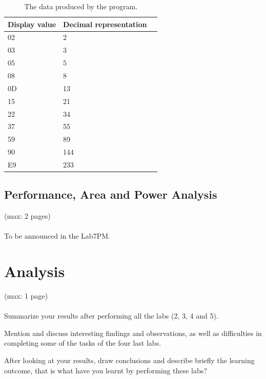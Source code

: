 \documentclass[a4,11pt]{article}
\begin{document}
\begin{table}   
	\centering
	\small
	\def\arraystretch{1.1}              
	\begin{tabular}{|l|l|l|}
		\hline
		Display value & Decimal representation \\ \hline
		02  & 2                                \\
    03  & 3                                \\
    05  & 5                                \\
    08  & 8                                \\
    0D  & 13                               \\
    15  & 21                               \\
    22  & 34                               \\
    37  & 55                               \\
    59  & 89                               \\
    90  & 144                              \\    
    E9  & 233                              \\ \hline
	\end{tabular}
	\caption{The data produced by the program.}
	\label{tab:fib_data}
\end{table}

\subsection{Performance, Area and Power Analysis}
(max: 2 pages)
\\\\
To be announced in the Lab7PM.

\section{Analysis}
(max: 1 page)
\\\\
Summarize your results after performing all the labs (2, 3, 4 and 5).

Mention and discuss interesting findings and observations, as well as difficulties in completing some of the tasks of the four last labs.

After looking at your results, draw conclusions and describe briefly the learning outcome, that is what have you learnt by performing these labs?  
\end{document}
